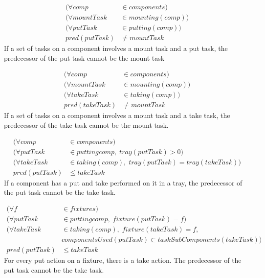 \documentclass[10pt,a4paper]{report}
\begin{document}
\begin{equation}
\begin{aligned}\label{eq:84}
(\forall comp &\in components) \\
(\forall mountTask &\in mounting(comp)) \\
(\forall putTask &\in putting(comp)) \\
pred(putTask) &\neq mountTask
\end{aligned}
\end{equation}
If a set of tasks on a component involves a mount task and a put task, the predecessor of the put task cannot be the mount task


\begin{equation}
\begin{aligned}\label{eq:85}
(\forall comp &\in components) \\
(\forall mountTask &\in mounting(comp)) \\
(\forall takeTask &\in taking(comp)) \\
pred(takeTask) &\neq mountTask
\end{aligned}
\end{equation}
If a set of tasks on a component involves a mount task and a take task, the predecessor of the take task cannot be the mount task.


\begin{equation}
\begin{aligned}\label{eq:86}
(\forall comp &\in components) \\
(\forall putTask &\in putting{comp}, \; tray(putTask) > 0) \\
(\forall takeTask &\in taking(comp), \; tray(putTask) = tray(takeTask)) \\
pred(putTask) &\le takeTask
\end{aligned}
\end{equation}
If a component has a put and take performed on it in a tray, the predecessor of the put task cannot be the take task.


\begin{equation}
\begin{aligned}\label{eq:87}
(\forall f &\in fixtures) \\
(\forall putTask &\in putting{comp}, \; fixture(putTask) = f) \\
(\forall takeTask &\in taking(comp), \; fixture(takeTask) = f,\\
&componentsUsed(putTask) \subset taskSubComponents(takeTask))\\
pred(putTask) &\le takeTask
\end{aligned}
\end{equation}
For every put action on a fixture, there is a take action. The predecessor of the put task cannot be the take task.
\end{document}
